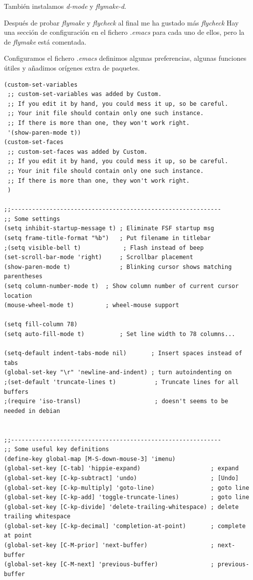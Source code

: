 \documentclass[12pt,spanish,]{scrartcl}
\begin{document}
También instalamos \emph{d-mode} y \emph{flymake-d}.

Después de probar \emph{flymake} y \emph{flycheck} al final me ha
gustado más \emph{flycheck} Hay una sección de configuración en el
fichero \emph{.emacs} para cada uno de ellos, pero la de \emph{flymake}
está comentada.

Configuramos el fichero \emph{.emacs} definimos algunas preferencias,
algunas funciones útiles y añadimos orígenes extra de paquetes.

\begin{verbatim}
(custom-set-variables
 ;; custom-set-variables was added by Custom.
 ;; If you edit it by hand, you could mess it up, so be careful.
 ;; Your init file should contain only one such instance.
 ;; If there is more than one, they won't work right.
 '(show-paren-mode t))
(custom-set-faces
 ;; custom-set-faces was added by Custom.
 ;; If you edit it by hand, you could mess it up, so be careful.
 ;; Your init file should contain only one such instance.
 ;; If there is more than one, they won't work right.
 )

;;------------------------------------------------------------
;; Some settings
(setq inhibit-startup-message t) ; Eliminate FSF startup msg
(setq frame-title-format "%b")   ; Put filename in titlebar
;(setq visible-bell t)            ; Flash instead of beep
(set-scroll-bar-mode 'right)     ; Scrollbar placement
(show-paren-mode t)              ; Blinking cursor shows matching parentheses
(setq column-number-mode t)  ; Show column number of current cursor location
(mouse-wheel-mode t)         ; wheel-mouse support

(setq fill-column 78)
(setq auto-fill-mode t)          ; Set line width to 78 columns...

(setq-default indent-tabs-mode nil)       ; Insert spaces instead of tabs
(global-set-key "\r" 'newline-and-indent) ; turn autoindenting on
;(set-default 'truncate-lines t)           ; Truncate lines for all buffers
;(require 'iso-transl)                     ; doesn't seems to be needed in debian


;;------------------------------------------------------------
;; Some useful key definitions
(define-key global-map [M-S-down-mouse-3] 'imenu)
(global-set-key [C-tab] 'hippie-expand)                    ; expand
(global-set-key [C-kp-subtract] 'undo)                     ; [Undo] 
(global-set-key [C-kp-multiply] 'goto-line)                ; goto line
(global-set-key [C-kp-add] 'toggle-truncate-lines)         ; goto line
(global-set-key [C-kp-divide] 'delete-trailing-whitespace) ; delete trailing whitespace
(global-set-key [C-kp-decimal] 'completion-at-point)       ; complete at point
(global-set-key [C-M-prior] 'next-buffer)                  ; next-buffer
(global-set-key [C-M-next] 'previous-buffer)               ; previous-buffer


\end{verbatim}
\end{document}
